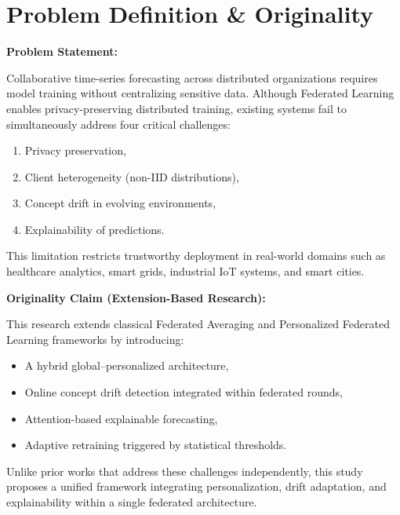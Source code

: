 \documentclass[11pt, a4paper]{article}
\begin{document}

\section{Problem Definition \& Originality}

\textbf{Problem Statement:}

Collaborative time-series forecasting across distributed organizations requires model training without centralizing sensitive data. Although Federated Learning enables privacy-preserving distributed training, existing systems fail to simultaneously address four critical challenges:

\begin{enumerate}[noitemsep]
\item Privacy preservation,
\item Client heterogeneity (non-IID distributions),
\item Concept drift in evolving environments,
\item Explainability of predictions.
\end{enumerate}

This limitation restricts trustworthy deployment in real-world domains such as healthcare analytics, smart grids, industrial IoT systems, and smart cities.

\vspace{0.2cm}

\textbf{Originality Claim (Extension-Based Research):}

This research extends classical Federated Averaging and Personalized Federated Learning frameworks by introducing:

\begin{itemize}[noitemsep]
\item A hybrid global–personalized architecture,
\item Online concept drift detection integrated within federated rounds,
\item Attention-based explainable forecasting,
\item Adaptive retraining triggered by statistical thresholds.
\end{itemize}

Unlike prior works that address these challenges independently, this study proposes a unified framework integrating personalization, drift adaptation, and explainability within a single federated architecture.
\end{document}
